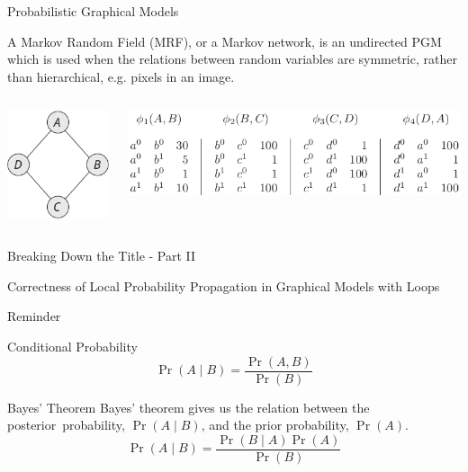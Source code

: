 \documentclass{beamer}
\begin{document}
\begin{frame}{Probabilistic Graphical Models}
    \pause
    \begin{definition}
        A Markov Random Field (MRF), or a Markov network, is an undirected PGM which is used when the relations between
        random variables are symmetric, rather than hierarchical, e.g. pixels in an image.
    \end{definition}
    \pause
    \begin{columns}
        \begin{column}[t]{0.2 \textwidth}
            \includegraphics[scale=0.4]{mrf1}
        \end{column}
        \begin{column}[t]{0.8 \textwidth}
            \includegraphics[scale=0.4]{mrf2}
        \end{column}
    \end{columns}
\end{frame}
\begin{frame}{Breaking Down the Title - Part II}
    \begin{center}
        \Large{Correctness of \alert<2>{Local Probability Propagation} in \alert<1>{Graphical Models} with Loops}
    \end{center}
\end{frame}
\begin{frame}{Reminder}
    \begin{block}{Conditional Probability}
        \[ \Pr \left( A \mid B \right) = \frac{\Pr \left( A, B \right)}{\Pr \left( B \right)} \]
    \end{block}
    \pause
    \begin{block}{Bayes' Theorem}
        Bayes' theorem gives us the relation between the \alert{posterior~probability}, $ \Pr \left( A \mid B \right) $, and the \alert{prior probability}, $ \Pr \left( A \right) $.
        \[ \Pr \left( A \mid B \right) = \frac{\Pr \left( B \mid A \right) \Pr \left( A \right)}{\Pr \left( B \right)} \]
    \end{block}
\end{frame}
\end{document}
